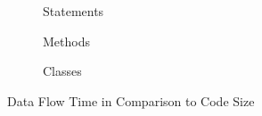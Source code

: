\documentclass[../draft.tex]{subfiles}
\begin{document}
    \begin{figure}
        \centering
        \begin{subfigure}[b]{\textwidth}
            \centering
            \begin{subfigure}[]{0.45\textwidth}
                \centering
                \resizebox{\columnwidth}{!}{
                    
                }
            \end{subfigure}
            \qquad
            \begin{subfigure}[]{0.45\textwidth}
                \centering
                \resizebox{\columnwidth}{!}{
                    
                }
            \end{subfigure}
            \caption{Statements}
        \end{subfigure}
        \bigbreak
        \begin{subfigure}[b]{\textwidth}
            \centering
            \begin{subfigure}[]{0.45\textwidth}
                \centering
                \resizebox{\columnwidth}{!}{
                    
                }
            \end{subfigure}
            \qquad
            \begin{subfigure}[]{0.45\textwidth}
                \centering
                \resizebox{\columnwidth}{!}{
                    
                }
            \end{subfigure}
            \caption{Methods}
        \end{subfigure}
        \bigbreak
        \begin{subfigure}[b]{\textwidth}
            \centering
            \begin{subfigure}[]{0.45\textwidth}
                \centering
                \resizebox{\columnwidth}{!}{
                    
                }
            \end{subfigure}
            \qquad
            \begin{subfigure}[]{0.45\textwidth}
                \centering
                \resizebox{\columnwidth}{!}{
                    
                }
            \end{subfigure}
            \caption{Classes}
        \end{subfigure}
        \caption{Data Flow Time in Comparison to Code Size}
        \label{f:dftocodesize}
    \end{figure}
\end{document}

